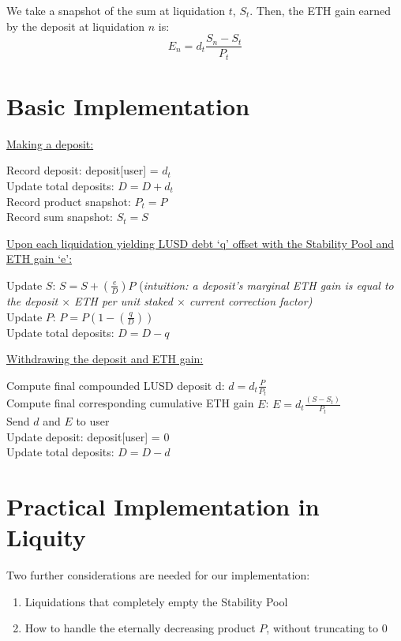 \documentclass[reqno]{article}
\begin{document}
\bigskip
We take a snapshot of the sum at liquidation $t$, {$S_t$}. Then, the ETH gain earned by the deposit at liquidation $n$ is:
\begin{equation} 
E_n=d_t\frac{S_n-S_t}{P_t}
\end{equation}

\bigskip
\section{Basic Implementation}
\underline{Making a deposit:}

Record deposit: deposit[user] = {$d_t$}\\
Update total deposits: {$D = D + d_t$}\\
Record product snapshot: {$P_t = P$}\\
Record sum snapshot: {$S_t = S$}

\bigskip
\underline{Upon each liquidation yielding LUSD debt ‘q’ offset with the Stability Pool and ETH gain ‘e’:}

Update $S$: {$S = S + (\frac{e}{D})P$} (\textit{intuition: a deposit’s marginal ETH gain is equal to the deposit $\times$ ETH per unit staked $\times$ current correction factor)}\\
Update $P$: {$P = P(1- (\frac{q}{D}))$}\\
Update total deposits: {$D = D - q$}

\bigskip
\underline{Withdrawing the deposit and ETH gain:}

Compute final compounded LUSD deposit d: {$d = d_t\frac{P}{P_t}$}\\
Compute final corresponding cumulative ETH gain $E$: {$E = d_t\frac{(S - S_t)}{P_t}$}\\
Send {$d$} and {$E$} to user\\
Update deposit: deposit[user] = 0\\
Update total deposits: {$D = D - d$}\\

\bigskip
\section{Practical Implementation in Liquity}
Two further considerations are needed for our implementation:
\begin{enumerate}
    \item Liquidations that completely empty the Stability Pool
    \item How to handle the eternally decreasing product {$P$}, without truncating to 0
\end{enumerate}
\end{document}
